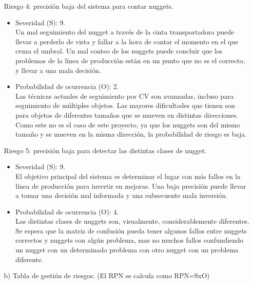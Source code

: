 \documentclass[
11pt, %
]{charter}
\begin{document}
Riesgo 4: precisión baja del sistema para contar nuggets.
\begin{itemize}
	\item Severidad (S):  9.\\
	Un mal seguimiento del nugget a través de la cinta transportadora puede llevar a perderlo de vista y fallar a la hora de contar el momento en el que cruza el umbral. Un mal conteo de los nuggets puede concluir que los problemas de la línea de producción están en un punto que no es el correcto, y llevar a una mala decisión.
	\item Probabilidad de ocurrencia (O): 2.\\
	Las técnicas actuales de seguimiento por CV son avanzadas, incluso para seguimiento de múltiples objetos. Las mayores dificultades que tienen son para objetos de diferentes tamaños que se mueven en distintas direcciones. Como este no es el caso de este proyecto, ya que los nuggets son del mismo tamaño y se mueven en la misma dirección, la probabilidad de riesgo es baja.
\end{itemize}

Riesgo 5: precisión baja para detectar las distintas clases de nugget.
\begin{itemize}
	\item Severidad (S):  9.\\
	El objetivo principal del sistema es determinar el lugar con más fallos en la línea de producción para invertir en mejoras. Una baja precisión puede llevar a tomar una decisión mal informada y una subsecuente mala inversión.
	\item Probabilidad de ocurrencia (O): 4.\\
	Las distintas clases de nuggets son, visualmente, considerablemente diferentes. Se espera que la matriz de confusión pueda tener algunos fallos entre nuggets correctos y nuggets con algún problema, mas no muchos fallos confundiendo un nugget con un determinado problema con otro nugget con un problema diferente.
\end{itemize}


b) Tabla de gestión de riesgos:      (El RPN se calcula como RPN=SxO)
\end{document}
